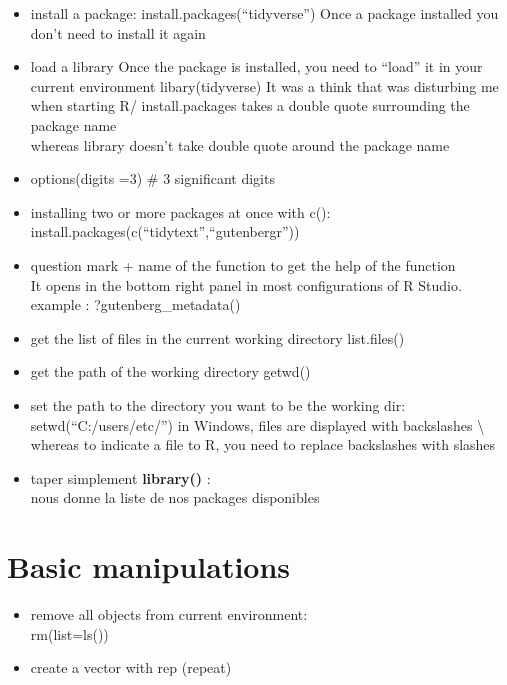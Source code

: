 \documentclass[
]{book}
\begin{document}
\begin{itemize}
\item
  install a package: install.packages(``tidyverse'')
  Once a package installed you don't need to install it again
\item
  load a library
  Once the package is installed, you need to ``load'' it in your current environment
  libary(tidyverse)
  It was a think that was disturbing me when starting R/
  install.packages takes a double quote surrounding the package name\\
  whereas library doesn't take double quote around the package name
\item
  options(digits =3) \# 3 significant digits
\item
  installing two or more packages at once with c():\\
  install.packages(c(``tidytext'',``gutenbergr''))
\item
  question mark + name of the function to get the help of the function\\
  It opens in the bottom right panel in most configurations of R Studio.
  example : ?gutenberg\_metadata()
\item
  get the list of files in the current working directory
  list.files()
\item
  get the path of the working directory
  getwd()
\item
  set the path to the directory you want to be the working dir:
  setwd(``C:/users/etc/'')
  in Windows, files are displayed with backslashes \textbackslash{} whereas to indicate
  a file to R, you need to replace backslashes with slashes
\item
  taper simplement \textbf{library()} :\\
  nous donne la liste de nos packages disponibles
\end{itemize}

\hypertarget{basic-manipulations}{%
\section{Basic manipulations}\label{basic-manipulations}}

\begin{itemize}
\item
  remove all objects from current environment:\\
  rm(list=ls())
\item
  create a vector with rep (repeat)
\end{itemize}
\end{document}
